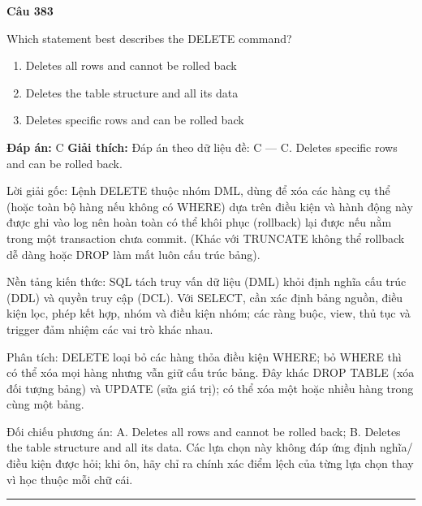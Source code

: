 \documentclass[11pt,a4paper]{article}
\newenvironment{question}[1]{%
  \par\vspace{1em}\noindent\textbf{\large Câu #1}\par\vspace{0.4em}
}{%
  \par\vspace{1em}\hrule\vspace{0.6em}
}
\newenvironment{choices}{%
  \begin{enumerate}[label=\textbf{\Alph*.},leftmargin=2.2em,itemsep=2pt,topsep=3pt]
}{%
  \end{enumerate}
}
\newcommand{\choice}{\item}
\begin{document}
\begin{question}{383}
Which statement best describes the DELETE command?
\begin{choices}
\choice Deletes all rows and cannot be rolled back
\choice Deletes the table structure and all its data
\choice Deletes specific rows and can be rolled back
\end{choices}
\textbf{Đáp án:} C
\textbf{Giải thích:} Đáp án theo dữ liệu đề: C — C. Deletes specific rows and can be rolled back.

Lời giải gốc: Lệnh DELETE thuộc nhóm DML, dùng để xóa các hàng cụ thể (hoặc toàn bộ hàng nếu không có WHERE) dựa trên điều kiện và hành động này được ghi vào log nên hoàn toàn có thể khôi phục (rollback) lại được nếu nằm trong một transaction chưa commit. (Khác với TRUNCATE không thể rollback dễ dàng hoặc DROP làm mất luôn cấu trúc bảng).

Nền tảng kiến thức: SQL tách truy vấn dữ liệu (DML) khỏi định nghĩa cấu trúc (DDL) và quyền truy cập (DCL). Với SELECT, cần xác định bảng nguồn, điều kiện lọc, phép kết hợp, nhóm và điều kiện nhóm; các ràng buộc, view, thủ tục và trigger đảm nhiệm các vai trò khác nhau.

Phân tích: DELETE loại bỏ các hàng thỏa điều kiện WHERE; bỏ WHERE thì có thể xóa mọi hàng nhưng vẫn giữ cấu trúc bảng. Đây khác DROP TABLE (xóa đối tượng bảng) và UPDATE (sửa giá trị); có thể xóa một hoặc nhiều hàng trong cùng một bảng.

Đối chiếu phương án: A. Deletes all rows and cannot be rolled back; B. Deletes the table structure and all its data. Các lựa chọn này không đáp ứng định nghĩa/điều kiện được hỏi; khi ôn, hãy chỉ ra chính xác điểm lệch của từng lựa chọn thay vì học thuộc mỗi chữ cái.
\end{question}
\end{document}
